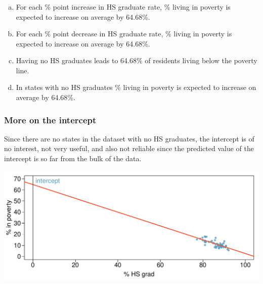 \begin{frame}
\frametitle{}


\begin{enumerate}[(a)]
\item For each \% point increase in HS graduate rate, \% living in poverty is expected to increase on average by 64.68\%.
\item For each \% point decrease in HS graduate rate, \% living in poverty is expected to increase on average by 64.68\%.
\item Having no HS graduates leads to 64.68\% of residents living below the poverty line.
\item In states with no HS graduates \% living in poverty is expected to increase on average by 64.68\%.
\end{enumerate}

\end{frame}


\begin{frame}
\frametitle{More on the intercept}

Since there are no states in the dataset with no HS graduates, the intercept is of no interest, not very useful, and also not reliable since the predicted value of the intercept is so far from the bulk of the data.

\begin{center}
\includegraphics[width=\textwidth]{8-2_least_square_reg/figures/poverty/poverty_hsgrad_line_wide}
\end{center}

\end{frame}



